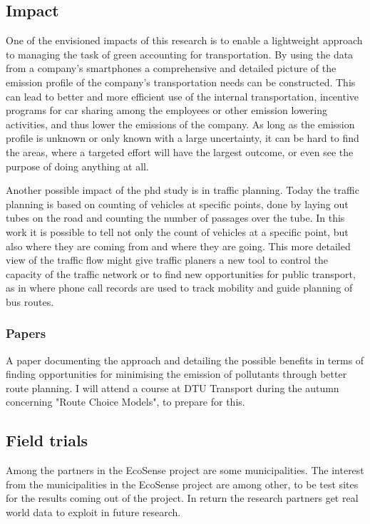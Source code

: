 \subsection{Impact}
One of the envisioned impacts of this research is to enable a lightweight approach to managing the task of green accounting for transportation. By using the data from a company's smartphones a comprehensive and detailed picture of the emission profile of the company's transportation needs can be constructed. This can lead to better and more efficient use of the internal transportation, incentive programs for car sharing among the employees or other emission lowering activities, and thus lower the emissions of the company. As long as the emission profile is unknown or only known with a large uncertainty, it can be hard to find the areas, where a targeted effort will have the largest outcome, or even see the purpose of doing anything at all.

Another possible impact of the phd study is in traffic planning. Today the traffic planning is based on counting of vehicles at specific points, done by laying out tubes on the road and counting the number of passages over the tube. In this work it is possible to tell not only the count of vehicles at a specific point, but also where they are coming from and where they are going. This more detailed view of the traffic flow might give traffic planers a new tool to control the capacity of the traffic network or to find new opportunities for public transport, as in \cite{Berlingerio2013} where phone call records are used to track mobility and guide planning of bus routes.

\subsubsection{Papers}
A paper documenting the approach and detailing the possible benefits in terms of finding opportunities for minimising the emission of pollutants through better route planning. I will attend a course at DTU Transport during the autumn concerning "Route Choice Models", to prepare for this.
\subsection{Field trials}
Among the partners in the EcoSense project are some municipalities. The interest from the municipalities in the EcoSense project are among other, to be test sites for the results coming out of the project. In return the research partners get real world data to exploit in future research.
